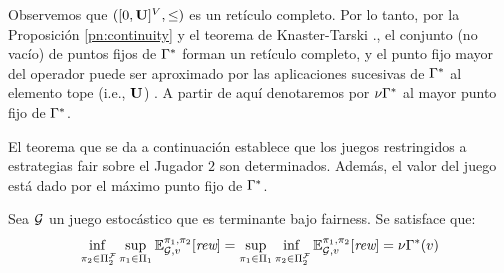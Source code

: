 Observemos que $([0,\mathbf{U}]^V, \leq)$ es un retículo completo. Por lo tanto, por la Proposición \ref{pn:continuity} y el teorema de Knaster-Tarski \cite{davey1990introduction}., el conjunto (no vacío) de puntos fijos de $\Gamma^*$ forman un retículo completo, y el punto fijo mayor del operador puede ser aproximado por las aplicaciones sucesivas de $\Gamma^*$ al elemento tope (i.e., $\mathbf{U}$) \cite{davey1990introduction}. A partir de aquí denotaremos por $\nu \Gamma^*$ al mayor punto fijo de $\Gamma^*$.

El teorema que se da a continuación establece que los juegos restringidos a estrategias fair sobre el Jugador $2$ son determinados.
Además, el valor del juego está dado por el máximo punto fijo de $\Gamma^*$.
\begin{theorem}\label{thm:game-determinacy} Sea $\mathcal{G}$ un juego estocástico que es terminante bajo fairness. Se satisface que:
\[\adjustlimits
	\inf_{\strat{2} \in \FairStrats{2}} \sup_{\strat{1} \in \Strategies{1}} \Expect{\strat{1}}{\strat{2}}_{\StochG,v}[\Rewards] = \adjustlimits \sup_{\strat{1} \in \Strategies{1}}   \inf_{\strat{2} \in \FairStrats{2}}  \Expect{\strat{1}}{\strat{2}}_{\StochG,v}[\Rewards] = \nu \Bellman(v)
\]
\end{theorem}
%
